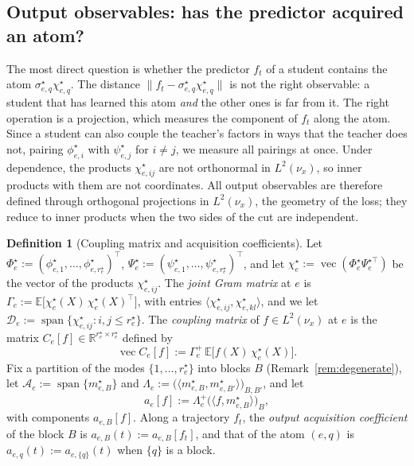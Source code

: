 \documentclass[11pt]{article}
\newcommand{\R}{\mathbb{R}}
\newcommand{\E}{\mathbb{E}}
\newcommand{\vect}{\operatorname{vec}}
\newcommand{\norm}[1]{\lVert #1\rVert}
\theoremstyle{definition}
\newtheorem{definition}[theorem]{Definition}
\numberwithin{equation}{section}
\begin{document}
\subsection{Output observables: has the predictor acquired an atom?}\label{sec:output-obs}

The most direct question is whether the predictor $f_t$ of a student contains the atom $\sigma^\star_{e,q}\chi^\star_{e,q}$. The distance $\norm{f_t-\sigma^\star_{e,q}\chi^\star_{e,q}}$ is not the right observable: a student that has learned this atom \emph{and} the other ones is far from it. The right operation is a projection, which measures the component of $f_t$ along the atom. Since a student can also couple the teacher's factors in ways that the teacher does not, pairing $\phi^\star_{e,i}$ with $\psi^\star_{e,j}$ for $i\neq j$, we measure all pairings at once. Under dependence, the products $\chi^\star_{e,ij}$ are not orthonormal in $L^2(\nu_x)$, so inner products with them are not coordinates. All output observables are therefore defined through orthogonal projections in $L^2(\nu_x)$, the geometry of the loss; they reduce to inner products when the two sides of the cut are independent.

\begin{definition}[Coupling matrix and acquisition coefficients]\label{def:coupling}
Let $\Phi^\star_e:=(\phi^\star_{e,1},\dots,\phi^\star_{e,r^\star_e})^\top$, $\Psi^\star_e:=(\psi^\star_{e,1},\dots,\psi^\star_{e,r^\star_e})^\top$, and let $\chi^\star_e:=\vect(\Phi^\star_e\Psi^{\star\top}_e)$ be the vector of the products $\chi^\star_{e,ij}$. The \emph{joint Gram matrix} at $e$ is $\Gamma_e:=\E\big[\chi^\star_e(X)\,\chi^\star_e(X)^\top\big]$, with entries $\langle\chi^\star_{e,ij},\chi^\star_{e,kl}\rangle$, and we let $\mathcal D_e:=\operatorname{span}\{\chi^\star_{e,ij}:i,j\le r^\star_e\}$. The \emph{coupling matrix} of $f\in L^2(\nu_x)$ at $e$ is the matrix $C_e[f]\in\R^{r^\star_e\times r^\star_e}$ defined by
\begin{equation}\label{eq:coupling}
\vect C_e[f]:=\Gamma_e^+\,\E\big[f(X)\,\chi^\star_e(X)\big].
\end{equation}
Fix a partition of the modes $\{1,\dots,r^\star_e\}$ into blocks $B$ (Remark~\ref{rem:degenerate}), let $\mathcal A_e:=\operatorname{span}\{m^\star_{e,B}\}$ and $\Lambda_e:=\big(\langle m^\star_{e,B},m^\star_{e,B'}\rangle\big)_{B,B'}$, and let
\[
a_e[f]:=\Lambda_e^+\big(\langle f,m^\star_{e,B}\rangle\big)_B,
\]
with components $a_{e,B}[f]$. Along a trajectory $f_t$, the \emph{output acquisition coefficient} of the block $B$ is $a_{e,B}(t):=a_{e,B}[f_t]$, and that of the atom $(e,q)$ is $a_{e,q}(t):=a_{e,\{q\}}(t)$ when $\{q\}$ is a block.
\end{definition}
\end{document}
